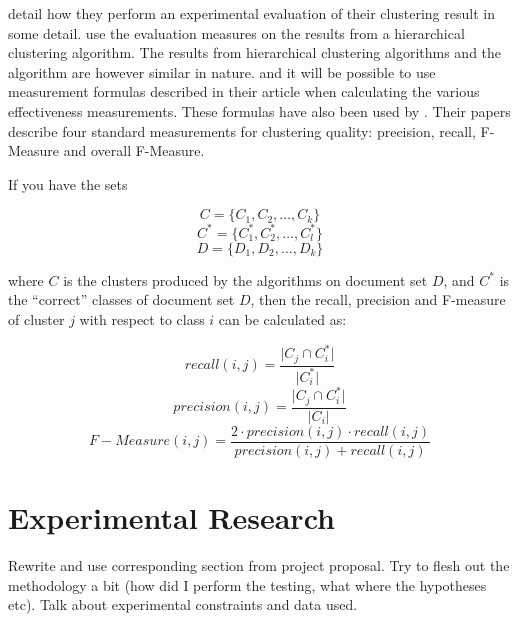 \cite{Chim2007} detail how they perform an experimental evaluation of their clustering result in some detail. \citeauthor{Chim2007} use the evaluation measures on the results from a hierarchical clustering algorithm. The results from hierarchical clustering algorithms and the \CTC algorithm are however similar in nature. and it will be possible to use measurement formulas described in their article when calculating the various effectiveness measurements. These formulas have also been used by \cite{Rafi2011}. Their papers describe four standard measurements for clustering quality: precision, recall, F-Measure and overall F-Measure.

If you have the sets

\begin{displaymath}
C = \{C_{1}, C_{2}, \dots, C_{k}\}
\end{displaymath}
\begin{displaymath}
C^* = \{C_1^*, C_2^*, \dots, C_l^*\}
\end{displaymath}
\begin{displaymath}
D = \{D_{1}, D_{2}, \dots, D_{k}\}
\end{displaymath}

where \(C\) is the clusters produced by the algorithms on document set \(D\), and \(C^*\) is the ``correct'' classes of document set \(D\), then the recall, precision and F-measure of cluster \(j\) with respect to class \(i\) can be calculated as:

\begin{displaymath}
recall(i,j) = \frac{\vert C_{j} \cap C_i^* \vert}{\vert C_i^* \vert}
\end{displaymath}
\begin{displaymath}
precision(i,j) = \frac{\vert C_{j} \cap C_i^* \vert}{\vert C_{i} \vert}
\end{displaymath}
\begin{displaymath}
F-Measure(i,j) = \frac{2 \cdot precision(i,j) \cdot recall(i,j)}{precision(i,j) + recall(i,j)}
\end{displaymath}


\section{Experimental Research}
\label{ExperimentalResearch}
Rewrite and use corresponding section from project proposal. Try to flesh out the methodology a bit (how did I perform the testing, what where the hypotheses etc). Talk about experimental constraints and data used.